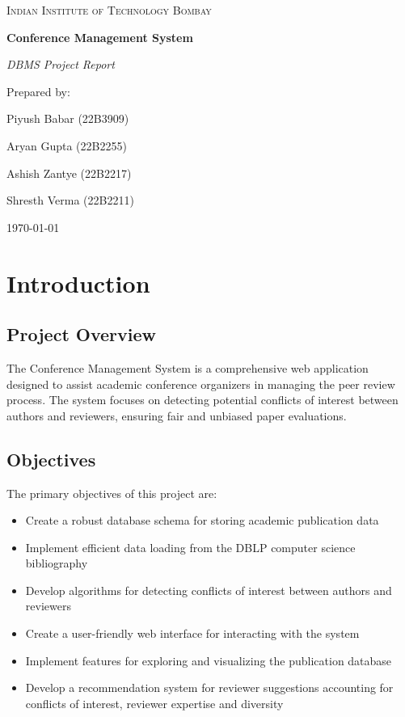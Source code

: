 \documentclass[12pt,a4paper]{article}
\begin{document}
\begin{titlepage}
    \centering
    \vspace*{1cm}
    {\scshape\LARGE Indian Institute of Technology Bombay \par}
    \vspace{1.5cm}
    {\huge\bfseries Conference Management System \par}
    \vspace{2cm}
    {\Large\itshape DBMS Project Report \par}
    \vspace{1.5cm}
    {\large Prepared by: \par}
    \vspace{0.5cm}
    {Piyush Babar (22B3909)\par}
    {Aryan Gupta (22B2255)\par}
    {Ashish Zantye (22B2217)\par}
    {Shresth Verma (22B2211)\par}
    \vfill
    {\large \today \par}
\end{titlepage}


\section{Introduction}
\subsection{Project Overview}
The Conference Management System is a comprehensive web application designed to assist academic conference organizers in managing the peer review process. The system focuses on detecting potential conflicts of interest between authors and reviewers, ensuring fair and unbiased paper evaluations.

\subsection{Objectives}
The primary objectives of this project are:
\begin{itemize}
    \item Create a robust database schema for storing academic publication data
    \item Implement efficient data loading from the DBLP computer science bibliography
    \item Develop algorithms for detecting conflicts of interest between authors and reviewers
    \item Create a user-friendly web interface for interacting with the system
    \item Implement features for exploring and visualizing the publication database
    \item Develop a recommendation system for reviewer suggestions accounting for conflicts of interest, reviewer expertise and diversity
\end{itemize}
\end{document}
